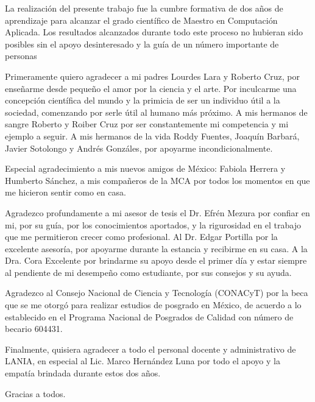 \documentclass[
12pt, %
spanish, %
singlespacing, %
headsepline, %
]{MastersDoctoralThesis} %
\theoremstyle{plain}
\theoremstyle{definition}
\begin{document}

\begin{acknowledgements}
\addchaptertocentry{\acknowledgementname} %
La realización del presente trabajo fue la cumbre formativa de dos años de aprendizaje para alcanzar el grado científico de Maestro en Computación Aplicada. Los resultados alcanzados durante todo este proceso no hubieran sido posibles sin el apoyo desinteresado y la guía de un número importante de personas 

Primeramente quiero agradecer a mi padres Lourdes Lara y Roberto Cruz, por enseñarme desde pequeño el amor por la ciencia y el arte. Por inculcarme una concepción científica del mundo y la primicia de ser un individuo útil a la sociedad, comenzando por serle útil al humano más próximo. A mis hermanos de sangre Roberto y Roiber Cruz por ser constantemente mi competencia y mi ejemplo a seguir. A mis hermanos de la vida Roddy Fuentes, Joaquín Barbará, Javier Sotolongo y  Andrés Gonzáles, por apoyarme incondicionalmente. 

Especial agradecimiento a mis nuevos amigos de México: Fabiola Herrera y Humberto Sánchez, a mis compañeros de la MCA por todos los momentos en que me hicieron sentir como en casa.

Agradezco profundamente a mi asesor de tesis el Dr. Efrén Mezura por confiar en mi, por su guía, por los conocimientos aportados, y la rigurosidad en el trabajo que me permitieron crecer como profesional. Al Dr. Edgar Portilla por la excelente asesoría, por apoyarme durante la estancia y recibirme en su casa. A la Dra. Cora Excelente por brindarme su apoyo desde el primer día y estar siempre al pendiente de mi desempeño como estudiante, por sus consejos y su ayuda.

Agradezco al Consejo Nacional de Ciencia y Tecnología (CONACyT) por la beca que se me otorgó  para realizar estudios de posgrado en México, de acuerdo a lo establecido en el Programa Nacional de Posgrados de Calidad con número de becario 604431.

Finalmente, quisiera agradecer a todo el personal docente y administrativo de LANIA, en especial al Lic. Marco Hernández Luna por todo el apoyo y la empatía brindada durante estos dos años.

Gracias a todos.  

\end{acknowledgements}
\end{document}
